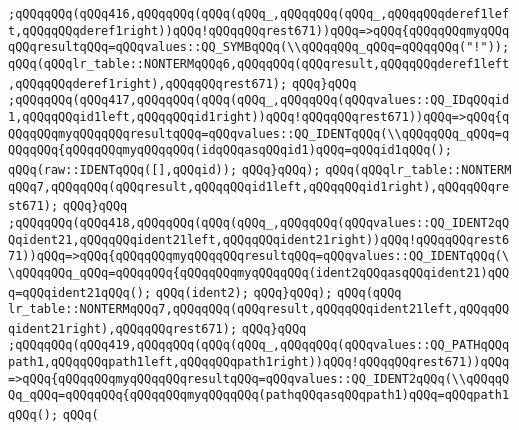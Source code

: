 \verb|;qQQqqQQq(qQQq416,qQQqqQQq(qQQq(qQQq_,qQQqqQQq(qQQq_,qQQqqQQqderef1left,qQQqqQQqderef1right))qQQq!qQQqqQQqrest671))qQQq=>qQQq{qQQqqQQqmyqQQqqQQqresultqQQq=qQQqvalues::QQ_SYMBqQQq(\\qQQqqQQq_qQQq=qQQqqQQq("!"));|\newline
\verb|qQQq(qQQqlr_table::NONTERMqQQq6,qQQqqQQq(qQQqresult,qQQqqQQqderef1left,qQQqqQQqderef1right),qQQqqQQqrest671);|\newline
\verb|qQQq}qQQq|\newline
\verb|;qQQqqQQq(qQQq417,qQQqqQQq(qQQq(qQQq_,qQQqqQQq(qQQqvalues::QQ_IDqQQqid1,qQQqqQQqid1left,qQQqqQQqid1right))qQQq!qQQqqQQqrest671))qQQq=>qQQq{qQQqqQQqmyqQQqqQQqresultqQQq=qQQqvalues::QQ_IDENTqQQq(\\qQQqqQQq_qQQq=qQQqqQQq{qQQqqQQqmyqQQqqQQq(idqQQqasqQQqid1)qQQq=qQQqid1qQQq();|\newline
\verb|qQQq(raw::IDENTqQQq([],qQQqid));|\newline
\verb|qQQq}qQQq);|\newline
\verb|qQQq(qQQqlr_table::NONTERM|\newline
\verb|qQQq7,qQQqqQQq(qQQqresult,qQQqqQQqid1left,qQQqqQQqid1right),qQQqqQQqrest671);|\newline
\verb|qQQq}qQQq|\newline
\verb|;qQQqqQQq(qQQq418,qQQqqQQq(qQQq(qQQq_,qQQqqQQq(qQQqvalues::QQ_IDENT2qQQqident21,qQQqqQQqident21left,qQQqqQQqident21right))qQQq!qQQqqQQqrest671))qQQq=>qQQq{qQQqqQQqmyqQQqqQQqresultqQQq=qQQqvalues::QQ_IDENTqQQq(\\qQQqqQQq_qQQq=qQQqqQQq{qQQqqQQqmyqQQqqQQq(ident2qQQqasqQQqident21)qQQq=qQQqident21qQQq();|\newline
\verb|qQQq(ident2);|\newline
\verb|qQQq}qQQq);|\newline
\verb|qQQq(qQQq|\newline
\verb|lr_table::NONTERMqQQq7,qQQqqQQq(qQQqresult,qQQqqQQqident21left,qQQqqQQqident21right),qQQqqQQqrest671);|\newline
\verb|qQQq}qQQq|\newline
\verb|;qQQqqQQq(qQQq419,qQQqqQQq(qQQq(qQQq_,qQQqqQQq(qQQqvalues::QQ_PATHqQQqpath1,qQQqqQQqpath1left,qQQqqQQqpath1right))qQQq!qQQqqQQqrest671))qQQq=>qQQq{qQQqqQQqmyqQQqqQQqresultqQQq=qQQqvalues::QQ_IDENT2qQQq(\\qQQqqQQq_qQQq=qQQqqQQq{qQQqqQQqmyqQQqqQQq(pathqQQqasqQQqpath1)qQQq=qQQqpath1qQQq();|\newline
\verb|qQQq(|\newline
